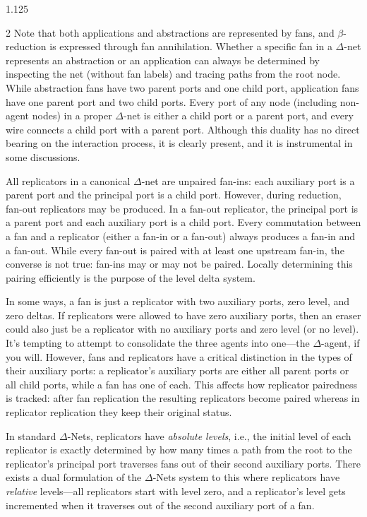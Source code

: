 \documentclass[10pt]{article}
\begin{document}
\begin{spacing}{1.125}
\begin{multicols}{2}
Note that both applications and abstractions are represented by fans, and \mbox{$\beta$-reduction} is expressed through fan annihilation.
Whether a specific fan in a \mbox{$\Delta$-net} represents an abstraction or an application can always be determined by inspecting the net (without fan labels) and tracing paths from the root node.
While abstraction fans have two parent ports and one child port, application fans have one parent port and two child ports.
Every port of any node (including non-agent nodes) in a proper \mbox{$\Delta$-net} is either a child port or a parent port, and every wire connects a child port with a parent port.
Although this duality has no direct bearing on the interaction process, it is clearly present, and it is instrumental in some discussions.

All replicators in a canonical \mbox{$\Delta$-net} are unpaired fan-ins: each auxiliary port is a parent port and the principal port is a child port.
However, during reduction, fan-out replicators may be produced.
In a fan-out replicator, the principal port is a parent port and each auxiliary port is a child port.
Every commutation between a fan and a replicator (either a fan-in or a fan-out) always produces a fan-in and a fan-out.
While every fan-out is paired with at least one upstream fan-in, the converse is not true: fan-ins may or may not be paired. Locally determining this pairing efficiently is the purpose of the level delta system.

In some ways, a fan is just a replicator with two auxiliary ports, zero level, and zero deltas. If replicators were allowed to have zero auxiliary ports, then an eraser could also just be a replicator with no auxiliary ports and zero level (or no level). It's tempting to attempt to consolidate the three agents into one---the \mbox{$\Delta$-agent}, if you will. However, fans and replicators have a critical distinction in the types of their auxiliary ports: a replicator's auxiliary ports are either all parent ports or all child ports, while a fan has one of each. This affects how replicator pairedness is tracked: after fan replication the resulting replicators become paired whereas in replicator replication they keep their original status.

In standard \mbox{$\Delta$-Nets}, replicators have \emph{absolute levels}, i.e., the initial level of each replicator is exactly determined by how many times a path from the root to the replicator's principal port traverses fans out of their second auxiliary ports.
There exists a dual formulation of the \mbox{$\Delta$-Nets} system to this where replicators have \emph{relative} levels---all replicators start with level zero, and a replicator's level gets incremented when it traverses out of the second auxiliary port of a fan.


\end{multicols}
\end{spacing}
\end{document}

